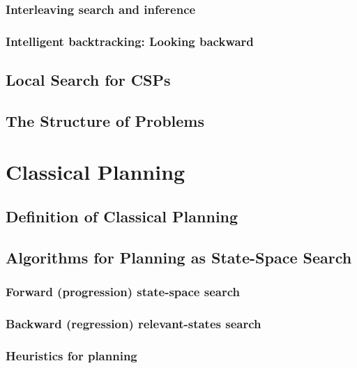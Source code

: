 \documentclass[11pt]{article}
\begin{document}

\subsubsection{Interleaving search and inference}


\subsubsection{Intelligent backtracking: Looking backward}


\subsection{Local Search for CSPs}


\subsection{The Structure of Problems}


\newpage
\setcounter{section}{9}
\section{Classical Planning}

\subsection{Definition of Classical Planning}

\subsection{Algorithms for Planning as State-Space Search}

\subsubsection{Forward (progression) state-space search}

\subsubsection{Backward (regression) relevant-states search}

\subsubsection{Heuristics for planning}
\end{document}

